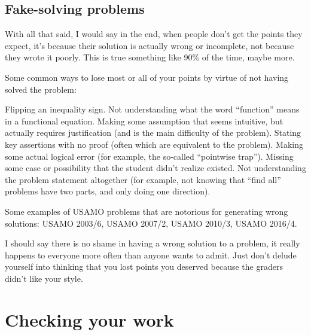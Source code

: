 \documentclass[11pt]{scrartcl}
\begin{document}
\subsection{Fake-solving problems}
With all that said, I would say in the end,
when \alert{people don't get the points they expect,
it's because their solution is actually wrong or incomplete},
not because they wrote it poorly.
This is true something like 90\% of the time, maybe more.

Some common ways to lose most or all of your points
by virtue of not having solved the problem:
\begin{itemize}
  \ii Flipping an inequality sign.
  \ii Not understanding what the word ``function'' means
  in a functional equation.
  \ii Making some assumption that seems intuitive,
  but actually requires justification (and is the main difficulty of the problem).
  \ii Stating key assertions with no proof
  (often which are equivalent to the problem).
  \ii Making some actual logical error
  (for example, the so-called ``pointwise trap'').
  \ii Missing some case or possibility that the student didn't realize existed.
  \ii Not understanding the problem statement altogether
  (for example, not knowing that ``find all'' problems have two parts,
  and only doing one direction).
\end{itemize}
Some examples of USAMO problems that are notorious for generating wrong solutions:
USAMO 2003/6, USAMO 2007/2, USAMO 2010/3, USAMO 2016/4.

I should say there is no shame in having a wrong solution to a problem,
it really happens to everyone more often than anyone wants to admit.
Just don't delude yourself into thinking that you lost points
you deserved because the graders didn't like your style.

\section{Checking your work}
\end{document}
